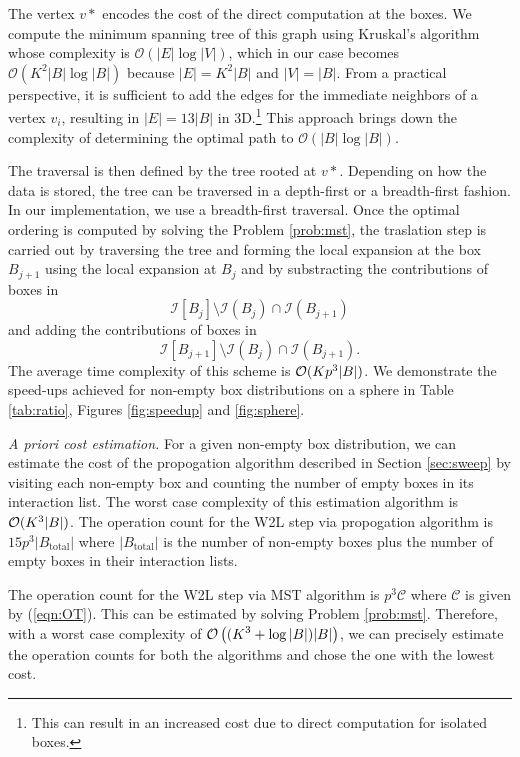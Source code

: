 The vertex $v*$ encodes the cost of the direct computation at the boxes. We compute the minimum spanning tree of this graph using Kruskal's algorithm \cite{kruskal56} whose complexity is $\mathcal{O}(|E| \log |V|)$, which in our case becomes $\mathcal{O}(K^2 |B| \log |B|)$ because $|E| = K^2 |B|$ and $|V| = |B|$. From a practical perspective, it is sufficient to add the edges for the immediate neighbors of a vertex $v_i$, resulting in $|E| = 13 |B|$ in 3D.\footnote{This can result in an increased cost due to direct computation for isolated boxes.} This approach brings down the complexity of determining the optimal path to $\mathcal{O}(|B| \log |B|)$. 

The traversal is then defined by the tree rooted at $v*$. Depending on how the data is stored, the tree can be traversed in a depth-first or a breadth-first fashion. In our implementation, we use a breadth-first traversal. Once the optimal ordering is computed by solving the Problem \ref{prob:mst}, the traslation step is carried out by traversing the tree and forming the local expansion at the box $B_{j+1}$ using the local expansion at $B_j$ and by substracting the contributions of boxes in \[\mathcal{I}[B_j] \setminus \mathcal{I}(B_j)\cap\mathcal{I}(B_{j+1}) \]
and adding the contributions of boxes in 
\[ \mathcal{I}[B_{j+1}] \setminus \mathcal{I}(B_j)\cap\mathcal{I}(B_{j+1}).\] 
The average time complexity of this scheme is $\mathcal{O}(K p^3 |B|)$. 
We demonstrate the speed-ups achieved for non-empty box distributions on a sphere in Table \ref{tab:ratio}, Figures \ref{fig:speedup} and \ref{fig:sphere}.
   

{\em A priori cost estimation.} For a given non-empty box distribution, we can estimate the cost of the propogation algorithm  described in Section \ref{sec:sweep} by visiting each non-empty box and counting the number of empty boxes in its interaction list. The worst case complexity of this estimation algorithm is $\mathcal{O}(K^3 |B|)$. The operation count for the W2L step via propogation algorithm is $15 p^3 |B_{\text{total}}|$ where $|B_{\text{total}}|$ is the number of non-empty boxes plus the number of empty boxes in their interaction lists. 

The operation count for the W2L step via MST algorithm is $p^3 \mathcal{C}$ where $\mathcal{C}$ is given by (\ref{eqn:OT}). This can be estimated by solving Problem \ref{prob:mst}. Therefore, with a worst case complexity of $\displaystyle \mathcal{O} \left((K^3 + \log |B|) |B|\right)$, we can precisely estimate the operation counts for both the algorithms and chose the one with the lowest cost. 

